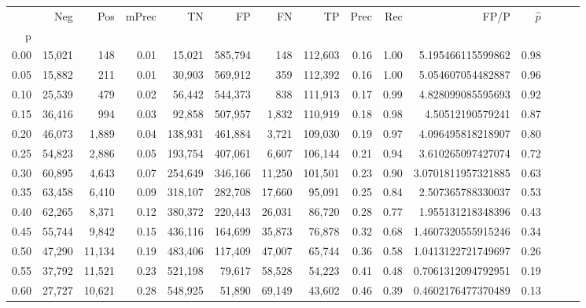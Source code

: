 \begin{tabular}{rrrrrrrrrrrrrrr}
\toprule
{} &     Neg &     Pos & mPrec &       TN &       FP &       FN &       TP &  Prec &   Rec &                  FP/P & $\hat{p}$ \\
p    &         &         &       &          &          &          &          &       &       &                       &           \\
\midrule
0.00 &  15,021 &     148 &  0.01 &   15,021 &  585,794 &      148 &  112,603 &  0.16 &  1.00 &     5.195466115599862 &      0.98 \\
0.05 &  15,882 &     211 &  0.01 &   30,903 &  569,912 &      359 &  112,392 &  0.16 &  1.00 &     5.054607054482887 &      0.96 \\
0.10 &  25,539 &     479 &  0.02 &   56,442 &  544,373 &      838 &  111,913 &  0.17 &  0.99 &     4.828099085595693 &      0.92 \\
0.15 &  36,416 &     994 &  0.03 &   92,858 &  507,957 &    1,832 &  110,919 &  0.18 &  0.98 &      4.50512190579241 &      0.87 \\
0.20 &  46,073 &   1,889 &  0.04 &  138,931 &  461,884 &    3,721 &  109,030 &  0.19 &  0.97 &     4.096495818218907 &      0.80 \\
0.25 &  54,823 &   2,886 &  0.05 &  193,754 &  407,061 &    6,607 &  106,144 &  0.21 &  0.94 &     3.610265097427074 &      0.72 \\
0.30 &  60,895 &   4,643 &  0.07 &  254,649 &  346,166 &   11,250 &  101,501 &  0.23 &  0.90 &    3.0701811957321885 &      0.63 \\
0.35 &  63,458 &   6,410 &  0.09 &  318,107 &  282,708 &   17,660 &   95,091 &  0.25 &  0.84 &     2.507365788330037 &      0.53 \\
0.40 &  62,265 &   8,371 &  0.12 &  380,372 &  220,443 &   26,031 &   86,720 &  0.28 &  0.77 &     1.955131218348396 &      0.43 \\
0.45 &  55,744 &   9,842 &  0.15 &  436,116 &  164,699 &   35,873 &   76,878 &  0.32 &  0.68 &    1.4607320555915246 &      0.34 \\
0.50 &  47,290 &  11,134 &  0.19 &  483,406 &  117,409 &   47,007 &   65,744 &  0.36 &  0.58 &    1.0413122721749697 &      0.26 \\
0.55 &  37,792 &  11,521 &  0.23 &  521,198 &   79,617 &   58,528 &   54,223 &  0.41 &  0.48 &    0.7061312094792951 &      0.19 \\
0.60 &  27,727 &  10,621 &  0.28 &  548,925 &   51,890 &   69,149 &   43,602 &  0.46 &  0.39 &    0.4602176477370489 &      0.13 \\

\end{tabular}
